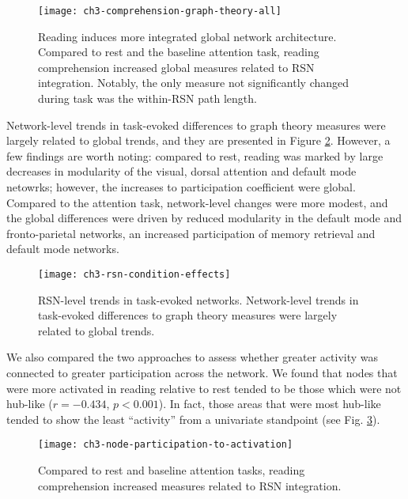 \begin{figure}[t]
	\centering
	\texttt{[image: ch3-comprehension-graph-theory-all]}
    \caption[Reading induces more integrated global network architecture.]{Reading induces more integrated global network architecture. Compared to rest and the baseline attention task, reading comprehension increased global measures related to RSN integration. Notably, the only measure not significantly changed during task was the within-RSN path length.}
	\label{fig:ch3-comprehension-graph-theory-all}
\end{figure}

Network-level trends in task-evoked differences to graph theory measures were largely related to global trends, and they are presented in Figure   \ref{fig:ch3-rsn-condition-effects}. However, a few findings are worth noting: compared to rest, reading was marked by large decreases in modularity of the visual, dorsal attention and default mode netowrks; however, the increases to participation coefficient were global. Compared to the attention task, network-level changes were more modest, and the global differences were driven by reduced modularity in the default mode and fronto-parietal networks, an increased participation of memory retrieval and default mode networks.

\begin{figure}[t]
	\centering
	\texttt{[image: ch3-rsn-condition-effects]}
    \caption[RSN-level trends in task-evoked networks.]{RSN-level trends in task-evoked networks. Network-level trends in task-evoked differences to graph theory measures were largely related to global trends.}
	\label{fig:ch3-rsn-condition-effects}
\end{figure}

We also compared the two approaches to assess whether greater activity was connected to greater participation across the network. We found that nodes that were more activated in reading relative to rest tended to be those which were not hub-like ($r = -0.434$, $p < 0.001$). In fact, those areas that were most hub-like tended to show the least ``activity'' from a univariate standpoint (see Fig. \ref{fig:ch3-node-participation-to-activation}). 

\begin{figure}[t]
	\centering
	\texttt{[image: ch3-node-participation-to-activation]}
    \caption[Activity is anti-correlated with participation coefficients.]{Compared to rest and baseline attention tasks, reading comprehension increased measures related to RSN integration.}
	\label{fig:ch3-node-participation-to-activation}
\end{figure}

